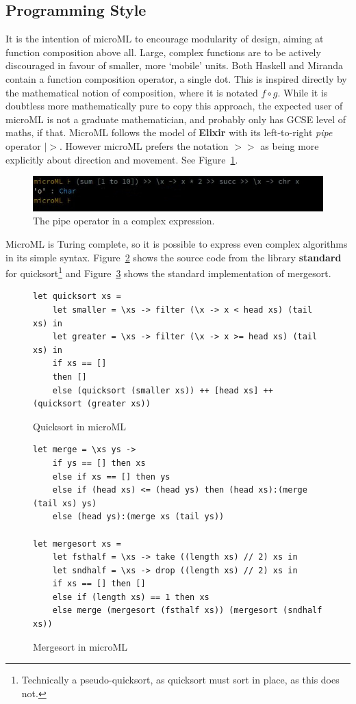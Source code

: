\documentclass[12pt, a4paper]{report}
\begin{document}
\subsection{Programming Style}
It is the intention of microML to encourage modularity of design, aiming at function composition
above all. Large, complex functions are to be actively discouraged in favour of smaller, more
`mobile' units. Both Haskell and Miranda contain a function composition operator, a single dot.
This is inspired directly by the mathematical notion of composition, where it is notated $f \circ
g$. While it is doubtless more mathematically pure to copy this approach, the expected user of
microML is not a graduate mathematician, and probably only has GCSE level of maths, if that. MicroML
follows the model of \textbf{Elixir} with its left-to-right \textit{pipe} operator $|>$. However
microML prefers the notation $>>$ as being more explicitly about direction and movement. See
Figure~\ref{fig:pipe}.

\begin{figure}
    \includegraphics[width=\textwidth]{images/pipe.jpg}
    \caption{The pipe operator in a complex expression.}
\label{fig:pipe}
\end{figure}

MicroML is Turing complete, so it is possible to express even complex algorithms in its simple
syntax. Figure~\ref{fig:quicksort} shows the source code from the library \textbf{standard} for
quicksort\footnote{Technically a pseudo-quicksort, as quicksort must sort in place, as this does
not.} and Figure~\ref{fig:mergesort} shows the standard implementation of mergesort. 

\begin{figure}
    \begin{verbatim}
let quicksort xs = 
    let smaller = \xs -> filter (\x -> x < head xs) (tail xs) in
    let greater = \xs -> filter (\x -> x >= head xs) (tail xs) in
    if xs == [] 
    then [] 
    else (quicksort (smaller xs)) ++ [head xs] ++ (quicksort (greater xs))
    \end{verbatim}
    \caption{Quicksort in microML}
\label{fig:quicksort}
\end{figure}
    
\begin{figure}
    \begin{verbatim}
let merge = \xs ys ->  
    if ys == [] then xs
    else if xs == [] then ys
    else if (head xs) <= (head ys) then (head xs):(merge (tail xs) ys)
    else (head ys):(merge xs (tail ys)) 

let mergesort xs =
    let fsthalf = \xs -> take ((length xs) // 2) xs in 
    let sndhalf = \xs -> drop ((length xs) // 2) xs in
    if xs == [] then []
    else if (length xs) == 1 then xs
    else merge (mergesort (fsthalf xs)) (mergesort (sndhalf xs))
    \end{verbatim}
    \caption{Mergesort in microML}
\label{fig:mergesort}
\end{figure}
\end{document}
